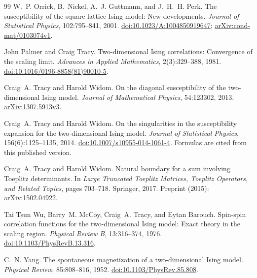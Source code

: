 \documentclass[11pt]{article}
\numberwithin{equation}{section}
\theoremstyle{definition}
\begin{document}
\begin{thebibliography}{99}
W.~P. Orrick, B.~Nickel, A.~J. Guttmann, and J.~H.~H. Perk.
\newblock The susceptibility of the square lattice {Ising} model:
New developments.
\newblock \emph{Journal of Statistical Physics}, 102:795--841, 2001.
\newblock \href{https://doi.org/10.1023/A:1004850919647}{doi:10.1023/A:1004850919647};
\href{https://arxiv.org/abs/cond-mat/0103074v1}{arXiv:cond-mat/0103074v1}.

John Palmer and Craig Tracy.
\newblock Two-dimensional {Ising} correlations: Convergence of the scaling limit.
\newblock \emph{Advances in Applied Mathematics}, 2(3):329--388, 1981.
\newblock \href{https://doi.org/10.1016/0196-8858(81)90010-5}{doi:10.1016/0196-8858(81)90010-5}.

Craig~A. Tracy and Harold Widom.
\newblock On the diagonal susceptibility of the two-dimensional {Ising} model.
\newblock \emph{Journal of Mathematical Physics}, 54:123302, 2013.
\newblock \href{https://arxiv.org/abs/1307.5913v3}{arXiv:1307.5913v3}.

Craig~A. Tracy and Harold Widom.
\newblock On the singularities in the susceptibility expansion for the
two-dimensional {Ising} model.
\newblock \emph{Journal of Statistical Physics}, 156(6):1125--1135, 2014.
\newblock \href{https://doi.org/10.1007/s10955-014-1061-4}{doi:10.1007/s10955-014-1061-4}.
\newblock Formulas are cited from this published version.

Craig~A. Tracy and Harold Widom.
\newblock Natural boundary for a sum involving {Toeplitz} determinants.
\newblock In \emph{Large Truncated Toeplitz Matrices, Toeplitz Operators,
and Related Topics}, pages 703--718. Springer, 2017.
\newblock Preprint (2015):
\href{https://arxiv.org/abs/1502.04922}{arXiv:1502.04922}.

Tai Tsun Wu, Barry~M. McCoy, Craig~A. Tracy, and Eytan Barouch.
\newblock Spin-spin correlation functions for the two-dimensional {Ising}
model: Exact theory in the scaling region.
\newblock \emph{Physical Review B}, 13:316--374, 1976.
\newblock \href{https://doi.org/10.1103/PhysRevB.13.316}{doi:10.1103/PhysRevB.13.316}.

C.~N. Yang.
\newblock The spontaneous magnetization of a two-dimensional {Ising} model.
\newblock \emph{Physical Review}, 85:808--816, 1952.
\newblock \href{https://doi.org/10.1103/PhysRev.85.808}{doi:10.1103/PhysRev.85.808}.

\end{thebibliography}
\end{document}

